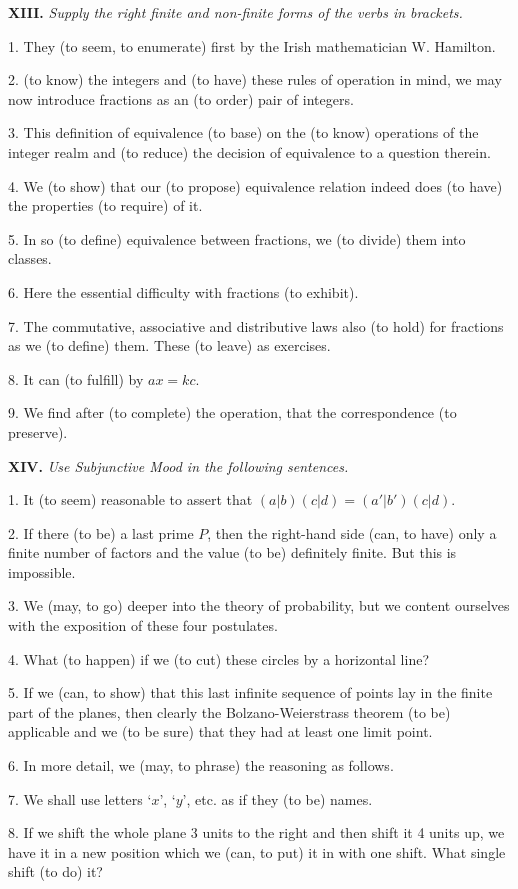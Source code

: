 \documentclass[a4paper]{article}
\newcommand{\ETask}[2]{\medskip\par\textbf{#1.} \textit{#2}\par}
\begin{document}
\ETask{XIII}{Supply the right finite and non-finite forms of the verbs in brackets.}

1. They (to seem, to enumerate) first by the Irish mathematician W. Hamilton.

2. (to know) the integers and (to have) these rules of operation in mind, we may now introduce fractions as an (to order)
pair of integers.

3. This definition of equivalence (to base) on the (to know) operations of the integer realm and (to reduce) the decision
of equivalence to a question therein.

4. We (to show) that our (to propose) equivalence relation indeed does (to have) the properties (to require) of it.

5. In so (to define) equivalence between fractions, we (to divide) them into classes.

6. Here the essential difficulty with fractions (to exhibit).

7. The commutative, associative and distributive laws also (to hold) for fractions as we (to define) them. These
(to leave) as exercises.

8. It can (to fulfill) by $ax = kc$.

9. We find after (to complete) the operation, that the correspondence (to preserve).

\ETask{XIV}{Use Subjunctive Mood in the following sentences.}

1. It (to seem) reasonable to assert that $(a|b)(c|d)=(a'|b')(c|d)$.

2. If there (to be) a last prime $P$, then the right-hand side (can, to have) only a finite number of factors and the value
(to be) definitely finite. But this is impossible.

3. We (may, to go) deeper into the theory of probability, but we content ourselves with the exposition of these four postulates.

4. What (to happen) if we (to cut) these circles by a horizontal line?

5. If we (can, to show) that this last infinite sequence of points lay in the finite part of the planes, then clearly
the Bolzano-Weierstrass theorem (to be) applicable and we (to be sure) that they had at least one limit point.

6. In more detail, we (may, to phrase) the reasoning as follows.

7. We shall use letters `$x$', `$y$', etc. as if they (to be) names.

8. If we shift the whole plane 3 units to the right and then shift it 4 units up, we have it in a new position which we
(can, to put) it in with one shift. What single shift (to do) it?
\end{document}
